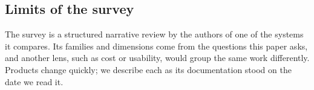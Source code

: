 \subsection{Limits of the survey}

The survey is a structured narrative review by the authors of one of the
systems it compares. Its families and dimensions come from the questions this
paper asks, and another lens, such as cost or usability, would group the same
work differently. Products change quickly; we describe each as its
documentation stood on the date we read it.

